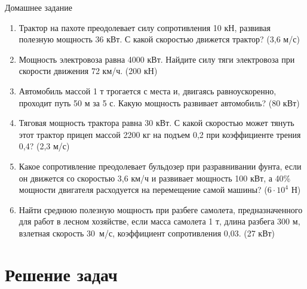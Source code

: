 \documentclass[a6paper, 11pt]{diss_4}
\renewcommand{\'}{\,'}
\begin{document}
\begin{center}
   Домашнее задание
\end{center}
\begin{enumerate}

\item Трактор на пахоте преодолевает силу сопротивления 10 кН, развивая полезную мощность 36 кВт. С какой скоростью движется трактор? (3,6 м/с)

\item Мощность электровоза равна 4000 кВт. Найдите силу тяги электровоза при скорости движения 72 км/ч. (200 кН)

\item Автомобиль массой 1 т трогается с места и, двигаясь равноускоренно, проходит путь 50 м за 5 с. Какую мощность развивает автомобиль? (80 кВт)


\item Тяговая мощность трактора равна 30 кВт. С какой скоростью может тянуть этот трактор прицеп массой 2200 кг на подъем 0,2 при коэффициенте трения 0,4? (2,3 м/с)

\item Какое сопротивление преодолевает бульдозер при разравнивании фунта, если он движется со скоростью 3,6 км/ч и развивает мощность 100 кВт, а 40\% мощности двигателя расходуется на перемещение самой машины? ($6\cdot10^4$ Н)

\item Найти среднюю полезную мощность при разбеге самолета, предназначенного для работ в лесном хозяйстве, если масса самолета 1 т, длина разбега 300 м, взлетная скорость 30 м/с, коэффициент сопротивления 0,03. (27 кВт)

\end{enumerate}


\section{Решение задач}
\end{document}
